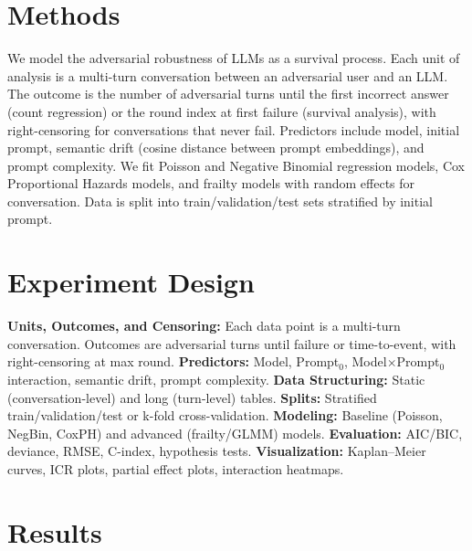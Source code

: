 \documentclass[letterpaper]{article}
\begin{document}
\section{Methods}
We model the adversarial robustness of LLMs as a survival process. Each unit of analysis is a multi-turn conversation between an adversarial user and an LLM. The outcome is the number of adversarial turns until the first incorrect answer (count regression) or the round index at first failure (survival analysis), with right-censoring for conversations that never fail. Predictors include model, initial prompt, semantic drift (cosine distance between prompt embeddings), and prompt complexity. We fit Poisson and Negative Binomial regression models, Cox Proportional Hazards models, and frailty models with random effects for conversation. Data is split into train/validation/test sets stratified by initial prompt.

\section{Experiment Design}
\textbf{Units, Outcomes, and Censoring:} Each data point is a multi-turn conversation. Outcomes are adversarial turns until failure or time-to-event, with right-censoring at max round.\newline
\textbf{Predictors:} Model, Prompt$_0$, Model$\times$Prompt$_0$ interaction, semantic drift, prompt complexity.\newline
\textbf{Data Structuring:} Static (conversation-level) and long (turn-level) tables.\newline
\textbf{Splits:} Stratified train/validation/test or k-fold cross-validation.\newline
\textbf{Modeling:} Baseline (Poisson, NegBin, CoxPH) and advanced (frailty/GLMM) models.\newline
\textbf{Evaluation:} AIC/BIC, deviance, RMSE, C-index, hypothesis tests.\newline
\textbf{Visualization:} Kaplan–Meier curves, ICR plots, partial effect plots, interaction heatmaps.

\section{Results}
\end{document}
